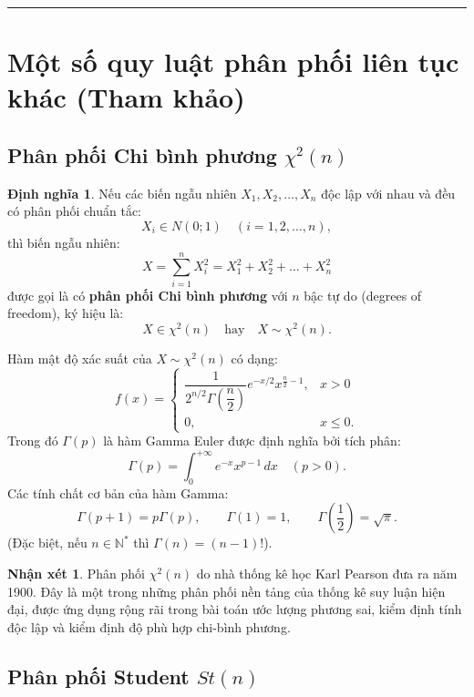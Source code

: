 \documentclass[12pt,a4paper]{article}
\theoremstyle{definition}
\newtheorem{dinhnghia}{Định nghĩa}[section]
\newtheorem{nhanxet}{Nhận xét}[section]
\begin{document}
\vspace{1.5em}
\hrule
\vspace{1.5em}

\section{Một số quy luật phân phối liên tục khác (Tham khảo)}

\subsection{Phân phối Chi bình phương \texorpdfstring{$\chi^2(n)$}{Chi-binh-phuong}}

\begin{dinhnghia}
Nếu các biến ngẫu nhiên $X_1, X_2, \dots, X_n$ độc lập với nhau và đều có phân phối chuẩn tắc:
\[
X_i \in N(0; 1) \quad (i = 1, 2, \dots, n),
\]
thì biến ngẫu nhiên:
\[
X = \sum_{i=1}^n X_i^2 = X_1^2 + X_2^2 + \dots + X_n^2
\]
được gọi là có \textbf{phân phối Chi bình phương} với $n$ bậc tự do (degrees of freedom), ký hiệu là:
\[
X \in \chi^2(n) \quad \text{hay} \quad X \sim \chi^2(n).
\]

Hàm mật độ xác suất của $X \sim \chi^2(n)$ có dạng:
\[
f(x) = \begin{cases}
\dfrac{1}{2^{n/2} \Gamma\left(\dfrac{n}{2}\right)} e^{-x/2} x^{\frac{n}{2} - 1}, & x > 0 \\
0, & x \le 0.
\end{cases}
\]
Trong đó $\Gamma(p)$ là hàm Gamma Euler được định nghĩa bởi tích phân:
\[
\Gamma(p) = \int_0^{+\infty} e^{-x} x^{p - 1}\,dx \quad (p > 0).
\]
Các tính chất cơ bản của hàm Gamma:
\[
\Gamma(p + 1) = p \Gamma(p), \qquad \Gamma(1) = 1, \qquad \Gamma\left(\frac{1}{2}\right) = \sqrt{\pi}.
\]
(Đặc biệt, nếu $n \in \mathbb{N}^*$ thì $\Gamma(n) = (n - 1)!$).
\end{dinhnghia}

\begin{nhanxet}
Phân phối $\chi^2(n)$ do nhà thống kê học Karl Pearson đưa ra năm 1900. Đây là một trong những phân phối nền tảng của thống kê suy luận hiện đại, được ứng dụng rộng rãi trong bài toán ước lượng phương sai, kiểm định tính độc lập và kiểm định độ phù hợp chi-bình phương.
\end{nhanxet}

\subsection{Phân phối Student \texorpdfstring{$St(n)$}{Student}}
\end{document}
